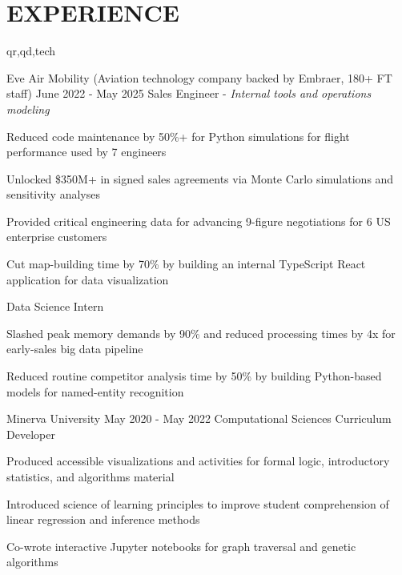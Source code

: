 \section{EXPERIENCE}

\begin{rolecontent}{qr,qd,tech}
\begin{experience}
                   {Eve Air Mobility \textnormal{(Aviation technology company backed by Embraer, 180+ FT staff)}}
                   {June 2022 - May 2025}
                   {Sales Engineer - \textnormal{\textit{Internal tools and operations modeling}}}
    \item Reduced code maintenance by 50\%+ for Python simulations for flight performance used by 7 engineers
    \item Unlocked \$350M+ in signed sales agreements via Monte Carlo simulations and sensitivity analyses
    \item Provided critical engineering data for advancing 9-figure negotiations for 6 US enterprise customers
    \item Cut map-building time by 70\% by building an internal TypeScript React application for data visualization 
\end{experience}
\end{rolecontent}

\vspace{0.1 cm}

\begin{same_org_experience}
                   {Data Science Intern}
    \item Slashed peak memory demands by 90\% and reduced processing times by 4x for early-sales big data pipeline
    \item Reduced routine competitor analysis time by 50\% by building Python-based models for named-entity recognition 
\end{same_org_experience}

\begin{exclude}{
    \begin{experience}
                   {Minerva University}
                   {May 2020 - May 2022}
                   {Computational Sciences Curriculum Developer}
    \item Produced accessible visualizations and activities for formal logic, introductory statistics, and algorithms material
    \item Introduced science of learning principles to improve student comprehension of linear regression and inference methods
    \item Co-wrote interactive Jupyter notebooks for graph traversal and genetic algorithms
\end{experience}
}
\end{exclude}


